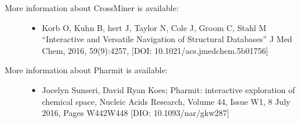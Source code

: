 \documentclass[letterpaper,10pt,english]{sphinxmanual}
\begin{document}
\begin{sphinxVerbatim}[commandchars=\\\{\}]
   
    
\end{sphinxVerbatim}
\begin{description}
\item[{More information about CrossMiner is available:}] \leavevmode\begin{itemize}
\item {} 
Korb O, Kuhn B, hert J, Taylor N, Cole J, Groom C, Stahl M “Interactive and Versatile Navigation of Structural Databases” J Med Chem, 2016, 59(9):4257, {[}DOI: 10.1021/acs.jmedchem.5b01756{]}

\end{itemize}

\item[{More information about Pharmit is available:}] \leavevmode\begin{itemize}
\item {} 
Jocelyn Sunseri, David Ryan Koes; Pharmit: interactive exploration of chemical space, Nucleic Acids Research, Volume 44, Issue W1, 8 July 2016, Pages W442\sphinxhyphen{}W448 {[}DIO: 10.1093/nar/gkw287{]}

\end{itemize}

\end{description}
\end{document}
